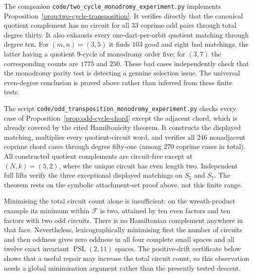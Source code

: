 \documentclass[11pt,a4paper]{article}
\theoremstyle{definition}
\theoremstyle{remark}
\newcommand{\PSL}{\operatorname{PSL}}
\begin{document}
The companion \nolinkurl{code/two_cycle_monodromy_experiment.py} implements Proposition~\ref{prop:two-cycle-transposition}.  It verifies directly that the canonical quotient complement has no circuit for all $33$ coprime odd pairs through total degree thirty.  It also exhausts every one-dart-per-orbit quotient matching through degree ten.  For $(m,n)=(3,5)$ it finds $103$ good and eight bad matchings, the latter having a quotient $9$-cycle of monodromy order five; for $(3,7)$ the corresponding counts are $1775$ and $250$.  These bad cases independently check that the monodromy parity test is detecting a genuine selection issue.  The universal even-degree conclusion is proved above rather than inferred from these finite tests.

The script \nolinkurl{code/odd_transposition_monodromy_experiment.py} checks every case of Proposition~\ref{prop:odd-cycle-chord} except the adjacent chord, which is already covered by the cited Hamiltonicity theorem.  It constructs the displayed matching, multiplies every quotient-circuit word, and verifies all $246$ nonadjacent coprime chord cases through degree fifty-one (among $270$ coprime cases in total).  All constructed quotient complements are circuit-free except at $(N,k)=(5,2)$, where the unique circuit has even length two.  Independent full lifts verify the three exceptional displayed matchings on $S_5$ and $S_7$.  The theorem rests on the symbolic attachment-set proof above, not this finite range.

Minimising the total circuit count alone is insufficient: on the wreath-product example its minimum within $\mathcal F$ is two, attained by ten even factors and ten factors with two odd circuits.  There is no Hamiltonian complement anywhere in that face.  Nevertheless, lexicographically minimising first the number of circuits and then oddness gives zero oddness in all four complete small spaces and all twelve exact invariant $\PSL(2,11)$ spaces.  The positive-drift certificate below shows that a useful repair may increase the total circuit count, so this observation needs a global minimisation argument rather than the presently tested descent.
\end{document}

